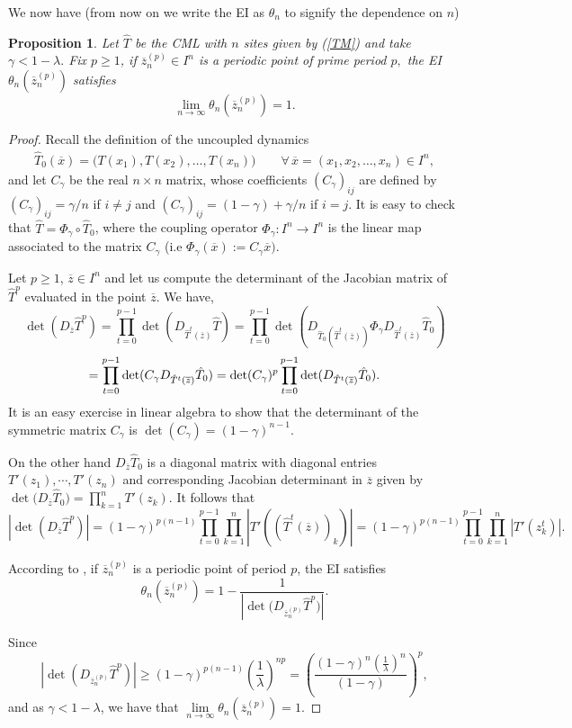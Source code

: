 \documentclass[12pt,reqno,a4paper]{amsart}
\newtheorem{prop}[thm]{Proposition}
\newcommand{\T}{{\mathcal{T}}}
\def\ox{\overline{x}}
\def\oz{\overline{z}}
\def\T{\hat{T}}
\begin{document}
We now have (from now on we write the EI as $\theta_n$ to signify the dependence on $n$)
\begin{prop}\label{pis}
Let $\hat{T}$ be the CML  with $n$ sites given by (\ref{TM}) and   take $\gamma<1-\lambda.$ Fix $p\ge 1$, if $\oz^{(p)}_n\in I^n$ is a periodic point of prime period $p,$ the EI $\theta_n(\oz^{(p)}_n)$ satisfies
$$
\lim\limits_{n\to\infty}\theta_{n}(\oz^{(p)}_n)=1.
$$
\end{prop}
	\begin{proof} Recall the definition of the uncoupled dynamics
		\begin{eqnarray*}
		\T_0(\ox)=\big(T(x_{1}), T(x_{2}), \ldots, T(x_{n})\big)\qquad\forall\, \ox=(x_1,x_2,\dots,x_n)\in I^n,
	\end{eqnarray*}
		 and let $C_{\gamma}$ be the real $n\times n$ matrix, whose coefficients ${(C_\gamma)}_{ij}$ are defined by $(C_\gamma)_{ij}=\gamma/n$ if $i\neq j$ and
	$(C_\gamma)_{ij}=(1-\gamma)+\gamma/n$ if $i=j$. It is easy to check that $\hat{T}=\Phi_\gamma\circ \T_0$,
	where the coupling operator $\Phi_\gamma: I^n\to I^n$  is the linear map associated to the matrix $C_\gamma$ (i.e	$\Phi_\gamma(\ox):=C_\gamma \ox)$.

	
	
		Let $p\geq 1$, $\oz\in I^n$ and let us  compute the determinant of the Jacobian matrix of $\hat{T}^p$ evaluated in the point $\oz$. We have,
		$$
			\det(D_{\oz}\hat{T}^p)=\prod_{t=0}^{p-1}\det(D_{\hat{T}^{t}(\oz)}\hat{T})
			=\prod_{t=0}^{p-1}\det(D_{\T_0(\hat{T}^{t}(\oz))}\Phi_\gamma D_{\hat{T}^{t}(\oz)}\T_0)$$
$$
			=\prod_{t=0}^{p-1}\det(C_\gamma D_{\hat{T}^{t}(\oz)}\T_0)\\
			=\det(C_\gamma)^{p}\prod_{t=0}^{p-1}\det(D_{\hat{T}^{t}(\oz)}\T_0).
		$$
		It is an easy exercise in linear algebra to show that the determinant of the symmetric matrix $C_\gamma$ is $\det(C_{\gamma})=(1-\gamma)^{n-1}.$

		On the other hand $D_{\oz} \T_0$ is a diagonal matrix with diagonal entries $T'(z_1),\cdots,  T'(z_{n})$ and corresponding  Jacobian determinant   in $\oz$  given by $\det\big(D_{\oz}\T_0\big)=\prod^{n}_{k=1}T'(z_k)$. It follows that
		\[
		|\det\left(D_{\oz}\hat{T}^{p}\right)|=(1-\gamma)^{p(n-1)}\prod^{p-1}_{t=0}\prod^{n}_{k=1}|T'((\hat{T}^t(\oz))_k)|=(1-\gamma)^{p(n-1)}\prod^{p-1}_{t=0}\prod^{n}_{k=1}|T'(z^t_k)|.
		\]
		
		 According to \cite{AFV}, if $\oz^{(p)}_n$ is a periodic point of period $p$, the EI satisfies	
		$$\theta_{n}(\oz^{(p)}_n)=1-\frac{1}{|\det\big(D_{\oz^{(p)}_n} \hat{T}^{p}\big)|}.$$
		
		Since
		\[
		|\det\left(D_{\oz^{(p)}_n}\hat{T}^{p}\right)|\geq(1-\gamma)^{p(n-1)}(\frac{1}{\lambda})^{np}=\left(\frac{(1-\gamma)^n(\frac{1}{\lambda})^n}{(1-\gamma)}\right)^p,
		\]
		and as $\gamma<1-\lambda$,  we have that $\lim\limits_{n\to\infty}\theta_{n}(\oz^{(p)}_n)=1$.
	\end{proof}
\end{document}
